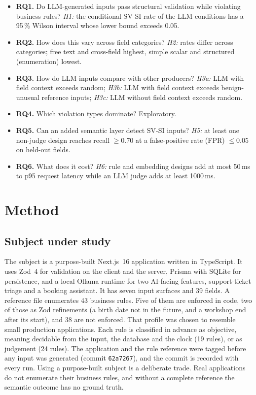 \documentclass[conference]{IEEEtran}
\begin{document}
\begin{itemize}
  \item \textbf{RQ1.} Do LLM-generated inputs pass structural validation while violating business
  rules? \emph{H1:} the conditional SV-SI rate of the LLM conditions has a 95\,\% Wilson interval whose
  lower bound exceeds 0.05.
  \item \textbf{RQ2.} How does this vary across field categories? \emph{H2:} rates differ across
  categories; free text and cross-field highest, simple scalar and structured (enumeration) lowest.
  \item \textbf{RQ3.} How do LLM inputs compare with other producers? \emph{H3a:} LLM with field
  context exceeds random; \emph{H3b:} LLM with field context exceeds benign-unusual reference inputs;
  \emph{H3c:} LLM without field context exceeds random.
  \item \textbf{RQ4.} Which violation types dominate? Exploratory.
  \item \textbf{RQ5.} Can an added semantic layer detect SV-SI inputs? \emph{H5:} at least one
  non-judge design reaches recall $\geq 0.70$ at a false-positive rate (FPR) $\leq 0.05$ on held-out
  fields.
  \item \textbf{RQ6.} What does it cost? \emph{H6:} rule and embedding designs add at most 50\,ms to
  p95 request latency while an LLM judge adds at least 1000\,ms.
\end{itemize}

\section{Method}
\label{sec:method}

\subsection{Subject under study}
The subject is a purpose-built Next.js~16 application written in TypeScript. It uses Zod~4 for
validation on the client and the server, Prisma with SQLite for persistence, and a local Ollama runtime
for two AI-facing features, support-ticket triage and a booking assistant. It has seven input surfaces
and 39 fields. A reference file enumerates 43 business rules. Five of them are enforced in code, two of
those as Zod refinements (a birth date not in the future, and a workshop end after its start), and 38
are not enforced. That profile was chosen to resemble small production applications. Each rule is
classified in advance as objective, meaning decidable from the input, the database and the clock (19
rules), or as judgement (24 rules). The application and the rule reference were tagged before any input
was generated (commit \texttt{62a7267}), and the commit is recorded with every run. Using a
purpose-built subject is a deliberate trade. Real applications do not enumerate their business rules,
and without a complete reference the semantic outcome has no ground truth.
\end{document}
